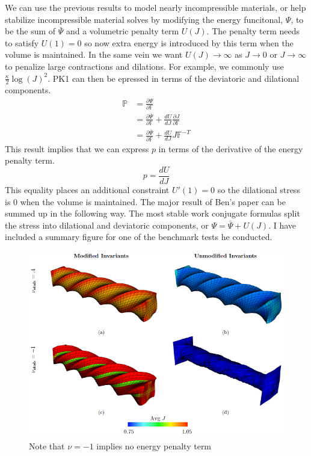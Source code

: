 \documentclass{article}
\def \p{\partial}
\def \FF{\mathbb{F}}
\def \PP{\mathbb{P}}
\begin{document}
We can use the previous results to model nearly incompressible materials, or help stabilize incompressible material solves by modifying the energy funcitonal, $\Psi$, to be the sum of $\bar\Psi$ and a volumetric penalty term $U(J)$. The penalty term needs to satisfy $U(1) = 0$ so now extra energy is introduced by this term when the volume is maintained. In the same vein we want $U(J)\to\infty$ as $J \to 0$ or $J\to\infty$ to penalize large contractions and dilations. For example, we commonly use $\frac{\kappa}{2}\log(J)^2$. PK1 can then be epressed in terms of the deviatoric and dilational components. 
\begin{align*}
    \PP &= \frac{\p\Psi}{\p\FF} \\
    &= \frac{\p\bar\Psi}{\p\FF} + \frac{dU}{dJ}\frac{\p J}{\p\FF} \\
    &= \frac{\p\bar\Psi}{\p\FF} + \frac{dU}{dJ}J\FF^{-T}
\end{align*}
This result implies that we can express $p$ in terms of the derivative of the energy penalty term.
\[p = \frac{dU}{dJ}\]
This equality places an additional constraint $U'(1) = 0$ so the dilational stress is 0 when the volume is maintained.
The major result of Ben's paper can be summed up in the following way. The most stable work conjugate formulas split the stress into dilational and deviatoric components, or $\Psi = \bar\Psi + U(J)$. I have included a summary figure for one of the benchmark tests he conducted.
\begin{figure}[ht]
\begin{center}
\includegraphics{twisting_beam.PNG}
\caption{Note that $\nu = -1$ implies no energy penalty term}
\end{center}
\end{figure}
\end{document}
